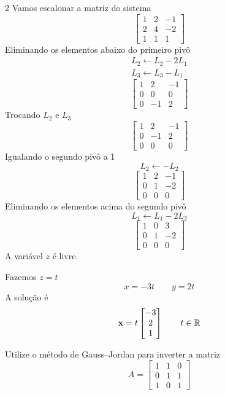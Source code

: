 \documentclass[a4paper,12pt,fleqn]{article}
\begin{document}
\begin{answer}
\begin{multicols}{2}
Vamos escalonar a matriz do sistema
\[
  \begin{bmatrix}
    1 & 2 & -1 \\
    2 & 4 & -2 \\
    1 & 1 &  1
  \end{bmatrix}
\]
Eliminando os elementos abaixo do primeiro pivô
\begin{gather*}
  L_2 \leftarrow L_2 - 2 L_1 \\
  L_3 \leftarrow L_3 - L_1
\end{gather*}
\[
\begin{bmatrix}
  1 & 2  & -1 \\
  0 & 0  & 0  \\
  0 & -1 & 2
\end{bmatrix}
\]
Trocando $L_2$ e $L_3$
\[
\begin{bmatrix}
  1 & 2  & -1 \\
  0 & -1 & 2  \\
  0 & 0  & 0
\end{bmatrix}
\]
Igualando o segundo pivô a 1
\[
  L_2 \leftarrow - L_2
\]
\[
\begin{bmatrix}
  1 & 2 & -1 \\
  0 & 1 & -2 \\
  0 & 0 & 0
\end{bmatrix}
\]
Eliminando os elementos acima do segundo pivô
\[
  L_1 \leftarrow L_1 - 2 L_2
\]
\[
\begin{bmatrix}
  1 & 0 &  3 \\
  0 & 1 & -2 \\
  0 & 0 &  0
\end{bmatrix}
\]
A variável $z$ é livre.

Fazemos $z=t$
\[
  x= -3t
  \qquad
  y = 2t
\]
A solução é
\[
  \mathbf{x}
  =
  t\begin{bmatrix}
    -3 \\
    2  \\
    1
  \end{bmatrix}
  \qquad t \in \mathbb{R}
\]
\end{multicols}
\end{answer}

Utilize o método de Gauss--Jordan para inverter a matriz
\[
  A =
  \begin{bmatrix}
    1 & 1 & 0 \\
    0 & 1 & 1 \\
    1 & 0 & 1
  \end{bmatrix}
\]
\end{document}
